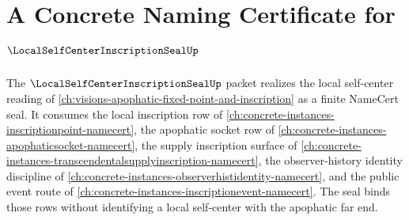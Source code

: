 \chapter{A Concrete Naming Certificate for $\LocalSelfCenterInscriptionSealUp$}
\label{ch:concrete-instances-local-self-center-inscription-seal-namecert}

The $\LocalSelfCenterInscriptionSealUp$ packet realizes the local self-center reading of \autoref{ch:visions-apophatic-fixed-point-and-inscription} as a finite NameCert seal. It consumes the local inscription row of \autoref{ch:concrete-instances-inscriptionpoint-namecert}, the apophatic socket row of \autoref{ch:concrete-instances-apophaticsocket-namecert}, the supply inscription surface of \autoref{ch:concrete-instances-transcendentalsupplyinscription-namecert}, the observer-history identity discipline of \autoref{ch:concrete-instances-observerhistidentity-namecert}, and the public event route of \autoref{ch:concrete-instances-inscriptionevent-namecert}. The seal binds those rows without identifying a local self-center with the apophatic far end.

